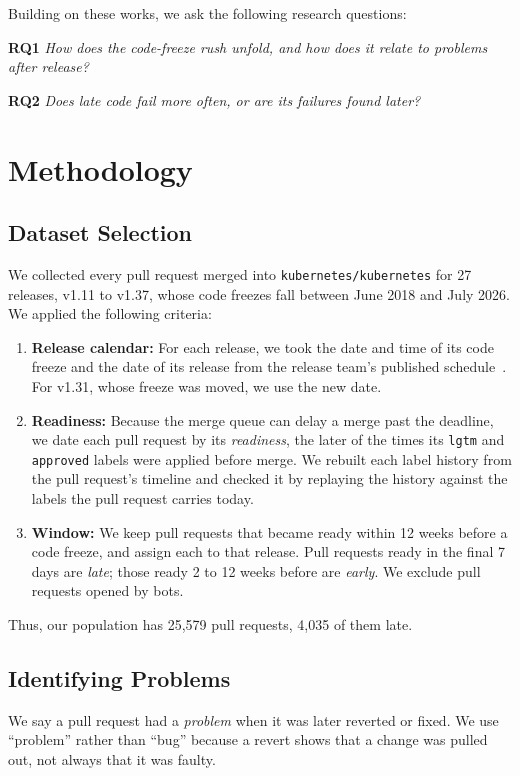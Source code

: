\documentclass[10pt,conference]{IEEEtran}
\begin{document}
Building on these works, we ask the following research questions:

\noindent\textbf{RQ1} \textit{How does the code-freeze rush unfold, and how does it relate to problems after release?}

\noindent\textbf{RQ2} \textit{Does late code fail more often, or are its failures found later?}

\section{Methodology}

\subsection{Dataset Selection}
We collected every pull request merged into \texttt{kubernetes/kubernetes} for 27 releases, v1.11 to v1.37, whose code freezes fall between June 2018 and July 2026. We applied the following criteria:
\begin{enumerate}
\renewcommand{\labelenumi}{\roman{enumi}.}
\item \textbf{Release calendar:} For each release, we took the date and time of its code freeze and the date of its release from the release team's published schedule~\cite{k8sschedules}. For v1.31, whose freeze was moved, we use the new date.
\item \textbf{Readiness:} Because the merge queue can delay a merge past the deadline, we date each pull request by its \emph{readiness}, the later of the times its \texttt{lgtm} and \texttt{approved} labels were applied before merge. We rebuilt each label history from the pull request's timeline and checked it by replaying the history against the labels the pull request carries today.
\item \textbf{Window:} We keep pull requests that became ready within 12 weeks before a code freeze, and assign each to that release. Pull requests ready in the final 7 days are \emph{late}; those ready 2 to 12 weeks before are \emph{early}. We exclude pull requests opened by bots.
\end{enumerate}
Thus, our population has 25,579 pull requests, 4,035 of them late.

\subsection{Identifying Problems}
We say a pull request had a \emph{problem} when it was later reverted or fixed. We use ``problem'' rather than ``bug'' because a revert shows that a change was pulled out, not always that it was faulty.
\end{document}
